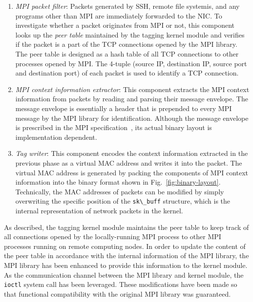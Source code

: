\begin{enumerate}
\def\labelenumi{\arabic{enumi}.}
\item
  \emph{MPI packet filter}: Packets generated by SSH, remote file
  systemis, and any programs other than MPI are immediately forwarded to
  the NIC\@. To investigate whether a packet originates from MPI or not,
  this component looks up the \emph{peer table} maintained by the
  tagging kernel module and verifies if the packet is a part of the TCP
  connections opened by the MPI library. The peer table is designed as a
  hash table of all TCP connections to other processes opened by MPI\@.
  The 4-tuple (source IP, destination IP, source port and destination
  port) of each packet is used to identify a TCP connection.
\item
  \emph{MPI context information extractor}: This component extracts the
  MPI context information from packets by reading and parsing their
  message envelope. The message envelope is essentially a header that is
  prepended to every MPI message by the MPI library for identification.
  Although the message envelope is prescribed in the MPI
  specification~\autocite{MPIForum2012}, its actual binary layout is
  implementation dependent.
\item
  \emph{Tag writer}: This component encodes the context information
  extracted in the previous phase as a virtual MAC address and writes it
  into the packet. The virtual MAC address is generated by packing the
  components of MPI context information into the binary format shown in
  Fig.~\ref{fig:binary-layout}. Technically, the MAC addresses of
  packets can be modified by simply overwriting the specific position of
  the \lstinline!sk\_buff! structure, which is the
  internal representation of network packets in the kernel.
\end{enumerate}

As described, the tagging kernel module maintains the peer table to keep
track of all connections opened by the locally-running MPI process to
other MPI processes running on remote computing nodes. In order to
update the content of the peer table in accordance with the internal
information of the MPI library, the MPI library has been enhanced to
provide this information to the kernel module. As the communication
channel between the MPI library and kernel module, the
\lstinline!ioctl! system call has been leveraged. These
modifications have been made so that functional compatibility with the
original MPI library was guaranteed.

